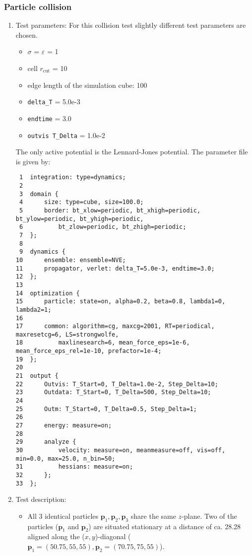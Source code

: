\documentclass[a4paper]{article}
\newcommand{\boldp}{\boldsymbol{p}}
\begin{document}
\subsubsection{Particle collision}
\label{sec-1-5-2}
\begin{enumerate}
\item Test parameters:
\label{sec-1-5-2-1}
For this collision test slightly different test parameters are chosen.
\begin{itemize}
\item $\sigma$ = $\varepsilon$ = 1
\item cell \(r_{\textrm{cut}}\) = 10
\item edge length of the simulation cube: 100
\item \texttt{delta\_T} = 5.0e-3
\item \texttt{endtime} = 3.0
\item \texttt{outvis T\_Delta} = 1.0e-2
\end{itemize}
The only active potential is the Lennard-Jones potential.
The parameter file is given by:
\begin{verbatim}
 1  integration: type=dynamics;
 2
 3  domain {
 4      size: type=cube, size=100.0;
 5      border: bt_xlow=periodic, bt_xhigh=periodic, bt_ylow=periodic, bt_yhigh=periodic,
 6          bt_zlow=periodic, bt_zhigh=periodic;
 7  };
 8
 9  dynamics {
10      ensemble: ensemble=NVE;
11      propagator, verlet: delta_T=5.0e-3, endtime=3.0;
12  };
13
14  optimization {
15      particle: state=on, alpha=0.2, beta=0.8, lambda1=0, lambda2=1;
16
17      common: algorithm=cg, maxcg=2001, RT=periodical, maxresetcg=6, LS=strongwolfe,
18          maxlinesearch=6, mean_force_eps=1e-6, mean_force_eps_rel=1e-10, prefactor=1e-4;
19  };
20
21  output {
22      Outvis: T_Start=0, T_Delta=1.0e-2, Step_Delta=10;
23      Outdata: T_Start=0, T_Delta=500, Step_Delta=10;
24
25      Outm: T_Start=0, T_Delta=0.5, Step_Delta=1;
26
27      energy: measure=on;
28
29      analyze {
30          velocity: measure=on, meanmeasure=off, vis=off, min=0.0, max=25.0, n_bin=50;
31          hessians: measure=on;
32      };
33  };
\end{verbatim}
\item Test description:
\label{sec-1-5-2-2}
\begin{itemize}
\item All 3 identical particles \(\boldp_1, \boldp_2, \boldp_3\) share the same \(z\)-plane. Two of the particles (\(\boldp_1\) and \(\boldp_2\)) are situated stationary
at a distance of ca. 28.28 aligned along the (\(x,y\))-diagonal (\(\boldp_1 = (50.75, 55, 55), \boldp_2 = (70.75, 75, 55)\)).

\end{itemize}
\end{enumerate}
\end{document}
